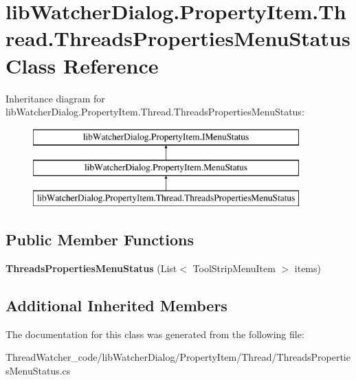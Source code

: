 \hypertarget{classlib_watcher_dialog_1_1_property_item_1_1_thread_1_1_threads_properties_menu_status}{\section{lib\+Watcher\+Dialog.\+Property\+Item.\+Thread.\+Threads\+Properties\+Menu\+Status Class Reference}
\label{classlib_watcher_dialog_1_1_property_item_1_1_thread_1_1_threads_properties_menu_status}
}
Inheritance diagram for lib\+Watcher\+Dialog.\+Property\+Item.\+Thread.\+Threads\+Properties\+Menu\+Status\+:\begin{figure}[H]
\begin{center}
\leavevmode
\includegraphics[height=3.000000cm]{classlib_watcher_dialog_1_1_property_item_1_1_thread_1_1_threads_properties_menu_status}
\end{center}
\end{figure}
\subsection*{Public Member Functions}
\begin{DoxyCompactItemize}
\item 
\hypertarget{classlib_watcher_dialog_1_1_property_item_1_1_thread_1_1_threads_properties_menu_status_a10293692a339d1ca4f4a0f670d2c7765}{{\bfseries Threads\+Properties\+Menu\+Status} (List$<$ Tool\+Strip\+Menu\+Item $>$ items)}\label{classlib_watcher_dialog_1_1_property_item_1_1_thread_1_1_threads_properties_menu_status_a10293692a339d1ca4f4a0f670d2c7765}

\end{DoxyCompactItemize}
\subsection*{Additional Inherited Members}


The documentation for this class was generated from the following file\+:\begin{DoxyCompactItemize}
\item 
Thread\+Watcher\+\_\+code/lib\+Watcher\+Dialog/\+Property\+Item/\+Thread/Threads\+Properties\+Menu\+Status.\+cs\end{DoxyCompactItemize}
